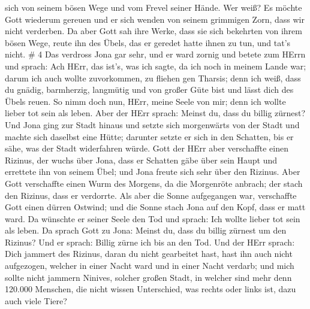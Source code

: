 sich von seinem bösen Wege und vom Frevel seiner Hände.  Wer
weiß? Es möchte Gott wiederum gereuen und er sich wenden von seinem
grimmigen Zorn, dass wir nicht verderben.  Da aber Gott sah
ihre Werke, dass sie sich bekehrten von ihrem bösen Wege, reute ihn des
Übels, das er geredet hatte ihnen zu tun, und tat's nicht. \# 4
 Das verdross Jona gar sehr, und er ward zornig 
und betete zum HErrn und sprach: Ach HErr, das ist's, was ich sagte, da
ich noch in meinem Lande war; darum ich auch wollte zuvorkommen, zu
fliehen gen Tharsis; denn ich weiß, dass du gnädig, barmherzig,
langmütig und von großer Güte bist und lässt dich des Übels reuen.
 So nimm doch nun, HErr, meine Seele von mir; denn ich
wollte lieber tot sein als leben.  Aber der HErr sprach:
Meinst du, dass du billig zürnest?  Und Jona ging zur Stadt
hinaus und setzte sich morgenwärts von der Stadt und machte sich
daselbst eine Hütte; darunter setzte er sich in den Schatten, bis er
sähe, was der Stadt widerfahren würde.  Gott der HErr aber
verschaffte einen Rizinus, der wuchs über Jona, dass er Schatten gäbe
über sein Haupt und errettete ihn von seinem Übel; und Jona freute sich
sehr über den Rizinus.  Aber Gott verschaffte einen Wurm des
Morgens, da die Morgenröte anbrach; der stach den Rizinus, dass er
verdorrte.  Als aber die Sonne aufgegangen war, verschaffte
Gott einen dürren Ostwind; und die Sonne stach Jona auf den Kopf, dass
er matt ward. Da wünschte er seiner Seele den Tod und sprach: Ich wollte
lieber tot sein als leben.  Da sprach Gott zu Jona: Meinst
du, dass du billig zürnest um den Rizinus? Und er sprach: Billig zürne
ich bis an den Tod.  Und der HErr sprach: Dich jammert des
Rizinus, daran du nicht gearbeitet hast, hast ihn auch nicht aufgezogen,
welcher in einer Nacht ward und in einer Nacht verdarb; 
und mich sollte nicht jammern Ninives, solcher großen Stadt, in welcher
sind mehr denn 120.000 Menschen, die nicht wissen Unterschied, was
rechts oder links ist, dazu auch viele Tiere?
